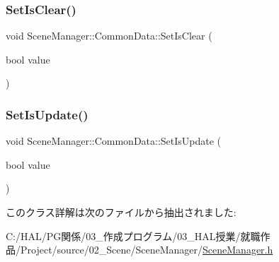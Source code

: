 \subsubsection{\texorpdfstring{Set\+Is\+Clear()}{SetIsClear()}}
{\footnotesize\ttfamily void Scene\+Manager\+::\+Common\+Data\+::\+Set\+Is\+Clear (\begin{DoxyParamCaption}\item[{bool}]{value }\end{DoxyParamCaption})\hspace{0.3cm}{\ttfamily [inline]}}

\mbox{\label{class_scene_manager_1_1_common_data_a5262310a89cbc72feef171229b206225}} 
\subsubsection{\texorpdfstring{Set\+Is\+Update()}{SetIsUpdate()}}
{\footnotesize\ttfamily void Scene\+Manager\+::\+Common\+Data\+::\+Set\+Is\+Update (\begin{DoxyParamCaption}\item[{bool}]{value }\end{DoxyParamCaption})\hspace{0.3cm}{\ttfamily [inline]}}



このクラス詳解は次のファイルから抽出されました\+:\begin{DoxyCompactItemize}
\item 
C\+:/\+H\+A\+L/\+P\+G関係/03\+\_\+作成プログラム/03\+\_\+\+H\+A\+L授業/就職作品/\+Project/source/02\+\_\+\+Scene/\+Scene\+Manager/\mbox{\hyperlink{_scene_manager_8h}{Scene\+Manager.\+h}}\end{DoxyCompactItemize}

